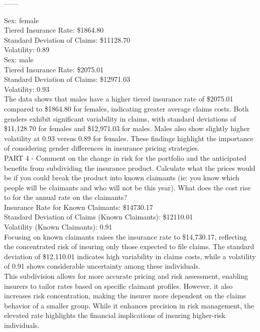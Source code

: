 \documentclass[12pt]{exam}
\begin{document}
\begin{questions}
------

Sex: female\\
Tiered Insurance Rate: \$1864.80\\
Standard Deviation of Claims: \$11128.70\\
Volatility: 0.89\\

Sex: male\\
Tiered Insurance Rate: \$2075.01\\
Standard Deviation of Claims: \$12971.03\\
Volatility: 0.93\\

The data shows that males have a higher tiered insurance rate of \$2075.01 compared to \$1864.80 for females, indicating greater average claims costs. Both genders exhibit significant variability in claims, with standard deviations of \$11,128.70 for females and \$12,971.03 for males. Males also show slightly higher volatility at 0.93 versus 0.89 for females. These findings highlight the importance of considering gender differences in insurance pricing strategies.\\

PART 4 - Comment on the change in risk for the portfolio and the anticipated benefits from subdividing the insurance product. Calculate what the prices would be if you could break the product into known claimants (ie: you know which people will be claimants and who will not be this year). What does the cost rise to for the annual rate on the claimants? \\

Insurance Rate for Known Claimants: \$14730.17\\
Standard Deviation of Claims (Known Claimants): \$12110.01\\
Volatility (Known Claimants): 0.91\\

Focusing on known claimants raises the insurance rate to \$14,730.17, reflecting the concentrated risk of insuring only those expected to file claims. The standard deviation of \$12,110.01 indicates high variability in claims costs, while a volatility of 0.91 shows considerable uncertainty among these individuals.\\

This subdivision allows for more accurate pricing and risk assessment, enabling insurers to tailor rates based on specific claimant profiles. However, it also increases risk concentration, making the insurer more dependent on the claims behavior of a smaller group. While it enhances precision in risk management, the elevated rate highlights the financial implications of insuring higher-risk individuals.\\

\end{questions}
\end{document}
